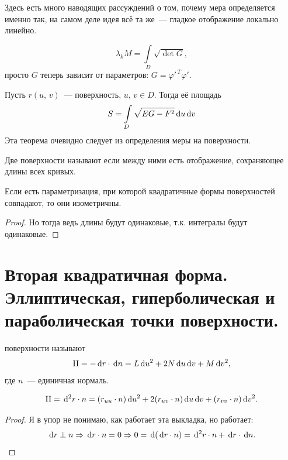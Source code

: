 \documentclass{notes}
\newcommand{\II}{\mr{II}}
\begin{document}
\begin{enumerate}
		Здесь есть много наводящих рассуждений о том, почему мера определяется именно так, на самом деле идея всё та же~--- гладкое отображение локально линейно.

		\begin{de}
			\[
				\lambda_k M = \int\limits_D \sqrt{\det G},
			\]
			просто $G$ теперь зависит от параметров: $G = \varphi'^{\,T} \varphi'$.
		\end{de}
	\end{enumerate}



	\begin{thm}
		Пусть $r(u, \, v)$~--- поверхность, $u, \, v \in D$. Тогда её площадь
		\[
			S = \int \limits_{D} \sqrt{EG - F^2} \, \mathrm{d} u \, \mathrm{d} v
		\]
		Эта теорема очевидно следует из определения меры на поверхности.
	\end{thm}

	\begin{de}
		Две поверхности называют  если между ними есть отображение, сохраняющее длины всех кривых.
	\end{de}

	\begin{thm}
		Если есть параметризация, при которой квадратичные формы поверхностей совпадают, то они изометричны.
		\begin{proof}
			Но тогда ведь длины будут одинаковые, т.к. интегралы будут одинаковые.
		\end{proof}
	\end{thm}

\section{Вторая квадратичная форма. Эллиптическая, гиперболическая и параболическая точки поверхности.}

	\begin{de}
		 поверхности называют
		\[
			\II = - \D r \cdot \D n = L \D u^2 + 2 N \D u \D v + M \D v^2,
		\]
		где $n$~--- единичная нормаль.
	\end{de}

	\begin{st}
		\[
			\II = \D^2 r \cdot n = (r_{uu} \cdot n) \D u^2 + 2 (r_{uv} \cdot n) \D u \D v + (r_{vv} \cdot n) \D v^2.
 		\]
 		\begin{proof}
 			Я в упор не понимаю, как работает эта выкладка, но работает:
 			\[
 				\, \mathrm{d} r \perp n \Rightarrow \, \mathrm{d} r \cdot n = 0 \Rightarrow 0 = \, \mathrm{d}(\, \mathrm{d} r \cdot n) = \, \mathrm{d}^2 r \cdot n + \, \mathrm{d} r \cdot \, \mathrm{d} n.
 			\]
 		\end{proof}
	\end{st}
\end{document}
